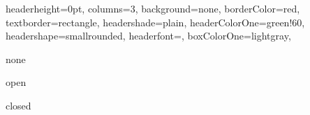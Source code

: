 \documentclass[portrait,fontscale=1,margin=0.2cm,paperwidth=15truecm, paperheight=1.5cm,debug]{baposter}
\begin{document}
\begin{poster}{
  headerheight=0pt,
  columns=3,
  background=none,
  borderColor=red,
  textborder=rectangle,
  headershade=plain,
  headerColorOne=green!60,
  headershape=smallrounded,
  headerfont={},
  boxColorOne=lightgray,
}{}{}{}{}

\begin{posterbox}[column=0,boxColorOne=lightgray,height=bottom,headerborder=none]{none}
\end{posterbox}

\begin{posterbox}[column=1,boxColorOne=lightgray,height=bottom,headerborder=open]{open}
\end{posterbox}

\begin{posterbox}[column=2,boxColorOne=lightgray,height=bottom,headerborder=closed]{closed}
\end{posterbox}

\end{poster}
\end{document}
